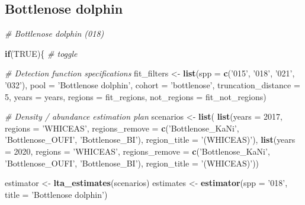\documentclass[
]{book}
\newenvironment{Shaded}{\begin{snugshade}}{\end{snugshade}}
\newcommand{\CommentTok}[1]{\textcolor[rgb]{0.56,0.35,0.01}{\textit{#1}}}
\newcommand{\ControlFlowTok}[1]{\textcolor[rgb]{0.13,0.29,0.53}{\textbf{#1}}}
\newcommand{\DataTypeTok}[1]{\textcolor[rgb]{0.13,0.29,0.53}{#1}}
\newcommand{\DecValTok}[1]{\textcolor[rgb]{0.00,0.00,0.81}{#1}}
\newcommand{\KeywordTok}[1]{\textcolor[rgb]{0.13,0.29,0.53}{\textbf{#1}}}
\newcommand{\NormalTok}[1]{#1}
\newcommand{\OtherTok}[1]{\textcolor[rgb]{0.56,0.35,0.01}{#1}}
\newcommand{\StringTok}[1]{\textcolor[rgb]{0.31,0.60,0.02}{#1}}
\begin{document}
\hypertarget{bottlenose-dolphin}{%
\subsection*{Bottlenose dolphin}\label{bottlenose-dolphin}}

\begin{Shaded}
\begin{Highlighting}[]
\CommentTok{# Bottlenose dolphin (018)}

\ControlFlowTok{if}\NormalTok{(}\OtherTok{TRUE}\NormalTok{)\{ }\CommentTok{# toggle}

  \CommentTok{# Detection function specifications}
\NormalTok{  fit_filters <-}
\StringTok{    }\KeywordTok{list}\NormalTok{(}\DataTypeTok{spp =} \KeywordTok{c}\NormalTok{(}\StringTok{'015'}\NormalTok{, }\StringTok{'018'}\NormalTok{, }\StringTok{'021'}\NormalTok{, }\StringTok{'032'}\NormalTok{),}
         \DataTypeTok{pool =} \StringTok{'Bottlenose dolphin'}\NormalTok{,}
         \DataTypeTok{cohort =} \StringTok{'bottlenose'}\NormalTok{,}
         \DataTypeTok{truncation_distance =} \DecValTok{5}\NormalTok{,}
         \DataTypeTok{years =}\NormalTok{ years,}
         \DataTypeTok{regions =}\NormalTok{ fit_regions,}
         \DataTypeTok{not_regions =}\NormalTok{ fit_not_regions)}

  \CommentTok{# Density / abundance estimation plan}
\NormalTok{  scenarios <-}\StringTok{ }\KeywordTok{list}\NormalTok{(}
    \KeywordTok{list}\NormalTok{(}\DataTypeTok{years =} \DecValTok{2017}\NormalTok{,}
       \DataTypeTok{regions =} \StringTok{'WHICEAS'}\NormalTok{,}
       \DataTypeTok{regions_remove =} \KeywordTok{c}\NormalTok{(}\StringTok{'Bottlenose_KaNi'}\NormalTok{, }\StringTok{'Bottlenose_OUFI'}\NormalTok{, }\StringTok{'Bottlenose_BI'}\NormalTok{),}
       \DataTypeTok{region_title =} \StringTok{'(WHICEAS)'}\NormalTok{),}
    \KeywordTok{list}\NormalTok{(}\DataTypeTok{years =} \DecValTok{2020}\NormalTok{,}
       \DataTypeTok{regions =} \StringTok{'WHICEAS'}\NormalTok{,}
       \DataTypeTok{regions_remove =} \KeywordTok{c}\NormalTok{(}\StringTok{'Bottlenose_KaNi'}\NormalTok{, }\StringTok{'Bottlenose_OUFI'}\NormalTok{, }\StringTok{'Bottlenose_BI'}\NormalTok{),}
       \DataTypeTok{region_title =} \StringTok{'(WHICEAS)'}\NormalTok{))}
  
\NormalTok{  estimator <-}\StringTok{ }\KeywordTok{lta_estimates}\NormalTok{(scenarios)}
\NormalTok{  estimates <-}\StringTok{ }\KeywordTok{estimator}\NormalTok{(}\DataTypeTok{spp =} \StringTok{'018'}\NormalTok{, }\DataTypeTok{title =} \StringTok{'Bottlenose dolphin'}\NormalTok{)}
  

\end{Highlighting}
\end{Shaded}
\end{document}
